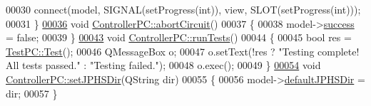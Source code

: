 \begin{DoxyCode}
00030     connect(model, SIGNAL(setProgress(\textcolor{keywordtype}{int})), view, SLOT(setProgress(\textcolor{keywordtype}{int})));
00031 \}
\hypertarget{controllerpc_8cpp_source_l00036}{}\hyperlink{class_controller_p_c_a8814989f7be1214e06b2e720889066b0}{00036} \textcolor{keywordtype}{void} \hyperlink{class_controller_p_c_a8814989f7be1214e06b2e720889066b0}{ControllerPC::abortCircuit}()
00037 \{
00038     model->\hyperlink{class_model_p_c_a945ffbbc44a832b953c191debd448f4c}{success} = \textcolor{keyword}{false};
00039 \}
\hypertarget{controllerpc_8cpp_source_l00043}{}\hyperlink{class_controller_p_c_aaa59fc90e1ef731eee4560ec87e43707}{00043} \textcolor{keywordtype}{void} \hyperlink{class_controller_p_c_aaa59fc90e1ef731eee4560ec87e43707}{ControllerPC::runTests}()
00044 \{
00045     \textcolor{keywordtype}{bool} res = \hyperlink{class_test_p_c_adec99ddd8910d45b6aca0a105f44960e}{TestPC::Test}();
00046     QMessageBox o;
00047     o.setText(!res ? \textcolor{stringliteral}{"Testing complete! All tests passed."} : \textcolor{stringliteral}{"Testing failed."});
00048     o.exec();
00049 \}
\hypertarget{controllerpc_8cpp_source_l00054}{}\hyperlink{class_controller_p_c_ac00d29685a7e5b780c01eb438e10f96d}{00054} \textcolor{keywordtype}{void} \hyperlink{class_controller_p_c_ac00d29685a7e5b780c01eb438e10f96d}{ControllerPC::setJPHSDir}(QString dir)
00055 \{
00056     model->\hyperlink{class_model_p_c_abd038306f14f22fb885a1697c96d6335}{defaultJPHSDir} = dir;
00057 \}
\end{DoxyCode}
